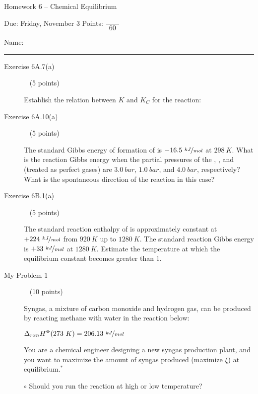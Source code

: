 \documentclass[12pt, openany, letterpaper]{memoir}
\begin{document}
\begin{center}
	{\large Homework 6 -- Chemical Equilibrium}
	
	Due: Friday, November 3 \hspace{3em} Points: ${\dfrac{~}{~~60~~}}$
\end{center}

Name: \rule[-.1mm]{15em}{0.1pt}

\begin{description}	
	\item [Exercise 6A.7(a)] ~ (5 points)
	
	Establish the relation between $K$ and $K_C$ for the reaction: 
	
	\vspace{18em}
	\item [Exercise 6A.10(a)] ~ (5 points)
	
	The standard Gibbs energy of formation of  is $-16.5~\nicefrac{kJ}{mol}$ at $298~K$. What is the reaction Gibbs energy when the partial pressures of the , , and  (treated as perfect gases) are $3.0~bar$, $1.0~bar$, and $4.0~bar$, respectively? What is the spontaneous direction of the reaction in this case?
	
	\vspace{20em}
	\item [Exercise 6B.1(a)] ~ (5 points)
	
	The standard reaction enthalpy of  is approximately constant at $+224~\nicefrac{kJ}{mol}$ from $920~K$ up to $1280~K$. The standard reaction Gibbs energy is $+33~\nicefrac{kJ}{mol}$ at $1280~K$. Estimate the temperature at which the equilibrium constant becomes greater than 1.
	
	\vspace{20em}
	\item [My Problem 1] ~ (10 points)
	
	Syngas, a mixture of carbon monoxide and hydrogen gas, can be produced by reacting methane with water in the reaction below:
	
	 \hspace{2em} $\Delta_{rxn}H^{\std}(273~K)=206.13~\nicefrac{kJ}{mol}$
	
	\noindent You are a chemical engineer designing a new syngas production plant, and you want to maximize the amount of syngas produced (maximize $\xi$) at equilibrium.$^*$
	
	\noindent $\circ$ Should you run the reaction at high or low temperature?
	

\end{description}
\end{document}
